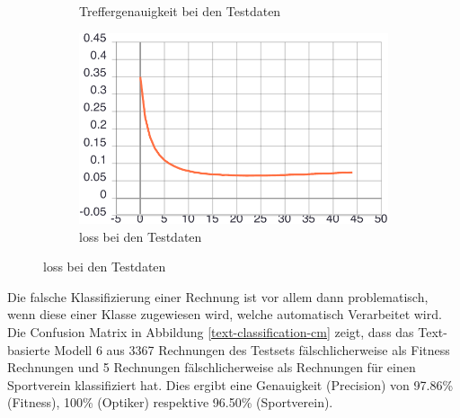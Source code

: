 \begin{figure}[h!]
\begin{subfigure}[b]{0.5\linewidth}
    \caption{Treffergenauigkeit bei den Testdaten} 
    \label{text-class-results:val_acc} 
  \end{subfigure}%
  \begin{subfigure}[b]{0.5\linewidth}
    \centering
    \includegraphics[width=0.75\linewidth]{graphics/text-classification/val_loss.pdf} 
    \caption{loss bei den Testdaten} 
    \label{text-class-results:val_loss} 
  \end{subfigure}
  \centering
\end{figure}

Die falsche Klassifizierung einer Rechnung ist vor allem dann problematisch, wenn diese einer Klasse zugewiesen wird, welche automatisch Verarbeitet wird. Die Confusion Matrix in Abbildung \ref{text-classification-cm} zeigt, dass das Text-basierte Modell 6 aus 3367 Rechnungen des Testsets fälschlicherweise als Fitness Rechnungen und 5 Rechnungen fälschlicherweise als Rechnungen für einen Sportverein klassifiziert hat. Dies ergibt eine Genauigkeit (Precision) von 97.86\% (Fitness), 100\% (Optiker) respektive 96.50\% (Sportverein).


